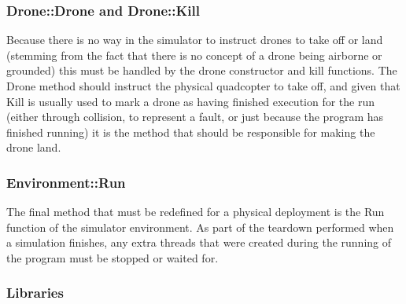 \subsubsection{Drone::Drone and Drone::Kill}
Because there is no way in the simulator to instruct drones to take off or land (stemming from the fact that there is no concept of a drone being airborne or grounded) this must be handled by the drone constructor and kill functions. The Drone method should instruct the physical quadcopter to take off, and given that Kill is usually used to mark a drone as having finished execution for the run (either through collision, to represent a fault, or just because the program has finished running) it is the method that should be responsible for making the drone land.

\subsubsection{Environment::Run}
The final method that must be redefined for a physical deployment is the Run function of the simulator environment. As part of the teardown performed when a simulation finishes, any extra threads that were created during the running of the program must be stopped or waited for.

\subsubsection{Libraries}
